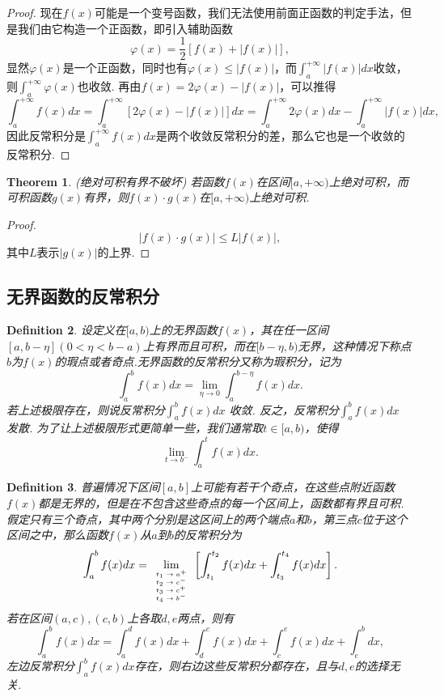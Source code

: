\documentclass{article}
\newtheorem{theorem}{Theorem}[section]
\newtheorem{definition}[theorem]{Definition}
\begin{document}
\begin{proof}
{\color{blue}现在$f(x)$可能是一个变号函数，我们无法使用前面正函数的判定手法，但是我们由它构造一个正函数}，即引入辅助函数
$$
\varphi(x) = \frac{1}{2}\left[f(x) + |f(x)|\right],
$$
显然$\varphi(x)$是一个正函数，同时也有$\varphi(x) \leq |f(x)|$，而$\int_a^{+\infty} |f(x)|dx$收敛，则$\int_a^{+\infty} \varphi(x)$也收敛. 再由$f(x) = 2\varphi(x) - |f(x)|$，可以推得
$$
\int_a^{+\infty} f(x)dx = \int_a^{+\infty} \left[2\varphi(x) - |f(x)| \right] dx=  \int_a^{+\infty} 2\varphi(x)dx - \int_a^{+\infty} |f(x)|dx,
$$ 
因此反常积分是$\int_a^{+\infty} f(x)dx$是两个收敛反常积分的差，那么它也是一个收敛的反常积分. 
\end{proof}

\begin{theorem}
\rm {\color{red} (绝对可积有界不破坏)} 若函数$f(x)$在区间$[a,+\infty)$上绝对可积，而可积函数$g(x)$有界，则$f(x)\cdot g(x)$在$[a,+\infty)$上绝对可积.
\end{theorem}

\begin{proof}
$$
|f(x)\cdot g(x)| \leq L|f(x)|,
$$
其中$L$表示$|g(x)|$的上界. 
\end{proof}

\subsection{无界函数的反常积分}


\begin{definition}
\rm 设定义在$[a,b)$上的无界函数$f(x)$，其在任一区间$[a,b-\eta](0 < \eta < b-a)$上有界而且可积，而在$[b-\eta,b)$无界，这种情况下称点$b$为$f(x)$的{\color{red}瑕点}或者{\color{red}奇点}.无界函数的反常积分又称为{\color{red}瑕积分}，记为
$$
\int_a^b f(x)dx = \lim\limits_{\eta \rightarrow 0} \int_a^{b-\eta} f(x)dx.
$$
若上述极限存在，则说反常积分$\int_a^b f(x)dx$ {\color{red}收敛}. 反之，反常积分$\int_a^b f(x)dx$ {\color{red}发散}. 为了让上述极限形式更简单一些，我们通常取$t \in [a,b)$，使得
$$
\lim\limits_{t \rightarrow b^{-}}\int_a^t f(x)dx.
$$
\end{definition}

\begin{definition}
\rm {\color{red}普遍情况下区间$[a,b]$上可能有若干个奇点}，在这些点附近函数$f(x)$都是无界的，但是在不包含这些奇点的每一个区间上，函数都有界且可积. 假定只有三个奇点，其中两个分别是这区间上的两个端点$a$和$b$，第三点$c$位于这个区间之中，那么函数$f(x)$从$a$到$b$的反常积分为
$$
\int_a^b f(x)dx = \lim\limits_{\mbox{\tiny$\begin{array}{ll}
t_1 \rightarrow	 a^+ \\
t_2 \rightarrow  c^- \\
t_3 \rightarrow  c^+ \\
t_4 \rightarrow  b^- \\
\end{array}$}} \left[ \int_{t_1}^{t_2}f(x)dx + \int_{t_3}^{t_4} f(x)dx \right].
$$
若在区间$(a,c),(c,b)$上各取$d,e$两点，则有
$$
\int_a^b f(x)dx  = \int_a^d f(x)dx + \int_d^c f(x)dx + \int_c^e f(x)dx + \int_e^b dx, 
$$
左边反常积分$\int_a^b f(x)dx$存在，则右边这些反常积分都存在，且与$d,e$的选择无关. 
\end{definition}
\end{document}
